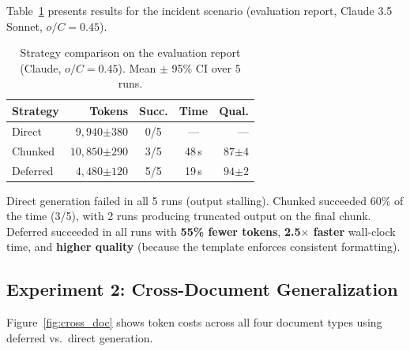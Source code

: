 \documentclass[11pt,twocolumn]{article}
\begin{document}
Table~\ref{tab:main_results} presents results for the incident
scenario (evaluation report, Claude 3.5 Sonnet, $o/C = 0.45$).

\begin{table}[t]
\centering
\caption{Strategy comparison on the evaluation report (Claude,
$o/C{=}0.45$).  Mean $\pm$ 95\% CI over 5 runs.}
\label{tab:main_results}
\small
\setlength{\tabcolsep}{3pt}
\begin{tabular}{@{}lrccr@{}}
\toprule
\textbf{Strategy} & \textbf{Tokens} & \textbf{Succ.} & \textbf{Time} & \textbf{Qual.} \\
\midrule
Direct    & $9{,}940{\scriptstyle\pm 380}$ & 0/5 & --- & --- \\
Chunked   & $10{,}850{\scriptstyle\pm 290}$ & 3/5 & 48\,s & $87{\scriptstyle\pm 4}$ \\
Deferred  & $4{,}480{\scriptstyle\pm 120}$  & 5/5 & 19\,s & $94{\scriptstyle\pm 2}$ \\
\bottomrule
\end{tabular}
\end{table}

Direct generation failed in all 5 runs (output stalling).
Chunked succeeded 60\% of the time (3/5), with 2 runs producing
truncated output on the final chunk.  Deferred succeeded in all
runs with \textbf{55\% fewer tokens}, \textbf{2.5$\times$ faster}
wall-clock time, and \textbf{higher quality} (because the template
enforces consistent formatting).

\subsection{Experiment 2: Cross-Document Generalization}

Figure~\ref{fig:cross_doc} shows token costs across all four
document types using deferred vs.\ direct generation.
\end{document}
